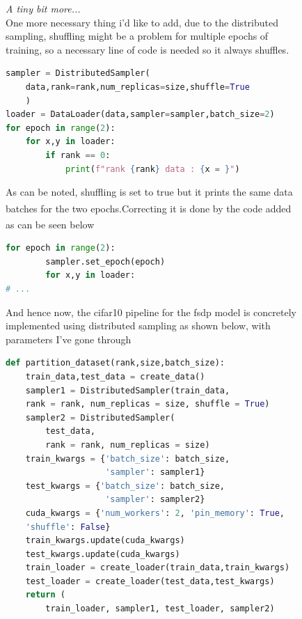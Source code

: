 \documentclass[12pt]{article}
\newcommand{\customtext}[3]{%
    \vspace{#2} %
    \fontsize{13}{8}\textcolor{#1}{\textit{#3}}%
}
\newcommand{\sidecite}[1]{\textsuperscript{\textcolor{blue}{\textbf{\scriptsize#1}}}}
\newcommand{\maincitecount}{\sidecite{\stepcounter{maincite}\themaincite}}
\begin{document}
\begin{figure}[!htb]
    \begin{minipage}[t]{0.65\textwidth}
    \raggedright
    \customtext{xtitle}{0em}{A tiny bit more...}\\
    One more necessary thing i'd like to add, due to the distributed sampling, shuffling might be a 
    problem for multiple epochs of training, so a necessary line of code is needed so it always shuffles.
\begin{lstlisting}[language=python,style=python,basicstyle=\ttfamily\footnotesize]
sampler = DistributedSampler(
    data,rank=rank,num_replicas=size,shuffle=True
    )
loader = DataLoader(data,sampler=sampler,batch_size=2)
for epoch in range(2):
    for x,y in loader:
        if rank == 0:
            print(f"rank {rank} data : {x = }")
\end{lstlisting}
As can be noted, shuffling is set to true but it prints the same data batches for the
two epochs.\maincitecount Correcting it is done by the code added as can be seen 
below\maincitecount 
\begin{lstlisting}[language=python,style=python,basicstyle=\ttfamily\footnotesize]
    for epoch in range(2):
        sampler.set_epoch(epoch)
        for x,y in loader:
# ...
\end{lstlisting}
And hence now, the cifar10 pipeline for the fsdp model is concretely implemented using 
distributed sampling as shown below, with parameters I've gone through
\begin{lstlisting}[language=python,style=python,basicstyle=\ttfamily\footnotesize]
def partition_dataset(rank,size,batch_size):
    train_data,test_data = create_data()
    sampler1 = DistributedSampler(train_data, 
    rank = rank, num_replicas = size, shuffle = True)
    sampler2 = DistributedSampler(
        test_data, 
        rank = rank, num_replicas = size)
    train_kwargs = {'batch_size': batch_size, 
                    'sampler': sampler1}
    test_kwargs = {'batch_size': batch_size, 
                    'sampler': sampler2}
    cuda_kwargs = {'num_workers': 2, 'pin_memory': True, 
    'shuffle': False}
    train_kwargs.update(cuda_kwargs)
    test_kwargs.update(cuda_kwargs)
    train_loader = create_loader(train_data,train_kwargs)
    test_loader = create_loader(test_data,test_kwargs)
    return (
        train_loader, sampler1, test_loader, sampler2) 
\end{lstlisting}
\vspace*{-3em}

\end{minipage}
\end{figure}
\end{document}
